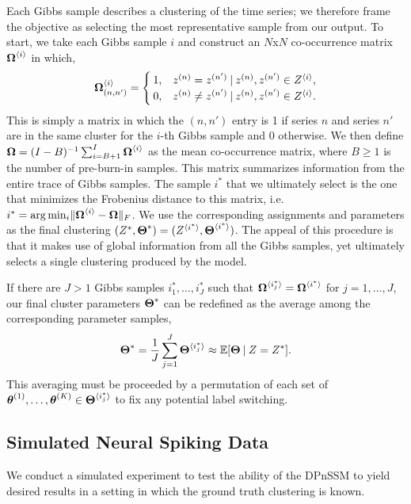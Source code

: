\documentclass[twoside]{article}
\begin{document}
Each Gibbs sample describes a clustering of the time series; we therefore frame the objective as selecting the most representative sample from our output.  To start, we take each Gibbs sample $i$ and construct an $N$x$N$ co-occurrence matrix $\baidx \Omega i$ in which, 
\begin{align}
\baidx [(n, n')] \Omega i =
\begin{cases}
1, & \idx z n = \idx z {n'} \given \idx z n, \idx z {n'} \in \aidx Z i,\\
0, & \idx z n \neq \idx z {n'} \given \idx z n, \idx z {n'} \in \aidx Z i.
\end{cases} \label{co-occurrence}
\end{align}
This is simply a matrix in which the $(n, n')$ entry is 1 if series $n$ and series $n'$ are in the same cluster for the $i$-th Gibbs sample and 0 otherwise.  {We then define {$\bd \Omega = (I-B)^{-1} \sum_{i=B+1}^I \baidx \Omega i$}} as the mean co-occurrence matrix, where $B \geq 1$ is the number of pre-burn-in samples.  This matrix summarizes information from the entire trace of Gibbs samples.  The sample $i^*$ that we ultimately select is the one that minimizes the Frobenius distance to this matrix, i.e. $i^* = \arg \min_{i} \norm{\baidx \Omega i - \bd \Omega}_F$.
We use the corresponding assignments and parameters as the final  clustering $(Z^*, \bd \Theta^*) = (\aidx Z {i^*}, \baidx \Theta {i^*})$.  The appeal of this procedure is that it makes use of global information from all the Gibbs samples, yet ultimately selects a single clustering produced by the model.  

If there are $J > 1$ Gibbs samples $i_1^*, \ldots, i_J^*$ such that $\baidx \Omega {i_j^*} = \baidx \Omega {i^*}$ for $j = 1, \ldots, J$, our final cluster parameters $\bd \Theta^*$ can be redefined as the average among the corresponding parameter samples,
\begin{align} \label{final-params}
\bd \Theta^* = \frac{1}{J} \sum_{j=1}^J \baidx \Theta {i_j^*} \approx \E[\bd \Theta \given Z = Z^*].
\end{align}
This averaging must be proceeded by a permutation of each set of $\bidx \theta 1, \ldots, \bidx \theta K \in \baidx \Theta {i_j^*}$ to fix any potential label switching.   

\subsection{Simulated Neural Spiking Data}
We conduct a simulated experiment to test the ability of the DPnSSM to yield desired results in a setting in which the ground truth clustering is known. 
\end{document}
